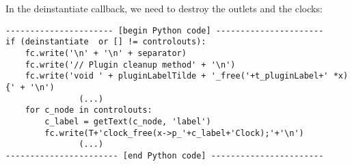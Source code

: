 \noindent In the deinstantiate callback, we need to destroy the outlets 
and the clocks:

\begin{verbatim}
---------------------- [begin Python code] ----------------------
if (deinstantiate  or [] != controlouts):
    fc.write('\n' + '\n' + separator)
    fc.write('// Plugin cleanup method' + '\n')
    fc.write('void ' + pluginLabelTilde + '_free('+t_pluginLabel+' *x){' + '\n')
               (...)
    for c_node in controlouts:
        c_label = getText(c_node, 'label')
        fc.write(T+'clock_free(x->p_'+c_label+'Clock);'+'\n')
               (...)
----------------------- [end Python code] -----------------------
\end{verbatim}
